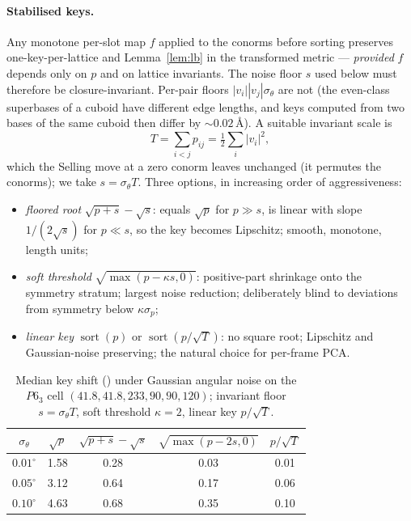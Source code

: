 \documentclass[11pt]{article}
\newcommand{\Ang}{\text{\AA}}
\begin{document}
\paragraph{Stabilised keys.}
Any monotone per-slot map $f$ applied to the conorms before sorting preserves one-key-per-lattice and Lemma~\ref{lem:lb} in the transformed metric --- \emph{provided} $f$ depends only on $p$ and on lattice invariants. The noise floor $s$ used below must therefore be closure-invariant. Per-pair floors $|v_i||v_j|\sigma_\theta$ are not (the even-class superbases of a cuboid have different edge lengths, and keys computed from two bases of the same cuboid then differ by $\sim0.02\,\Ang$). A suitable invariant scale is
\[
T=\sum_{i<j}p_{ij}=\tfrac12\sum_i|v_i|^2 ,
\]
which the Selling move at a zero conorm leaves unchanged (it permutes the conorms); we take $s=\sigma_\theta T$. Three options, in increasing order of aggressiveness:
\begin{itemize}
\item \emph{floored root} $\sqrt{p+s}-\sqrt s$: equals $\sqrt p$ for $p\gg s$, is linear with slope $1/(2\sqrt s)$ for $p\ll s$, so the key becomes Lipschitz; smooth, monotone, length units;
\item \emph{soft threshold} $\sqrt{\max(p-\kappa s,0)}$: positive-part shrinkage onto the symmetry stratum; largest noise reduction; deliberately blind to deviations from symmetry below $\kappa\sigma_p$;
\item \emph{linear key} $\operatorname{sort}(p)$ or $\operatorname{sort}(p/\sqrt T)$: no square root; Lipschitz and Gaussian-noise preserving; the natural choice for per-frame PCA.
\end{itemize}

\begin{table}[h]
\centering
\caption{Median key shift (\Ang) under Gaussian angular noise on the $P6_3$ cell $(41.8,41.8,233,90,90,120)$; invariant floor $s=\sigma_\theta T$, soft threshold $\kappa=2$, linear key $p/\sqrt T$.}
\label{tab:noise}
\begin{tabular}{ccccc}
\toprule
$\sigma_\theta$ & $\sqrt p$ & $\sqrt{p+s}-\sqrt s$ & $\sqrt{\max(p-2s,0)}$ & $p/\sqrt T$ \\
\midrule
$0.01^\circ$ & 1.58 & 0.28 & 0.03 & 0.01 \\
$0.05^\circ$ & 3.12 & 0.64 & 0.17 & 0.06 \\
$0.10^\circ$ & 4.63 & 0.68 & 0.35 & 0.10 \\
\bottomrule
\end{tabular}
\end{table}
\end{document}
